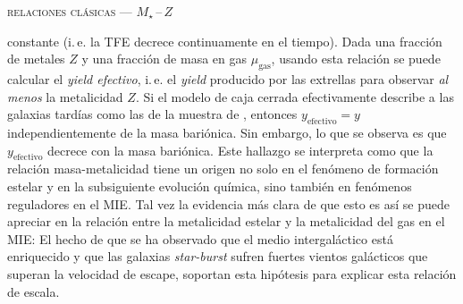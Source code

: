 \documentclass[xcolor=dvipsnames,4pt,hyperref={colorlinks,citecolor=black,linkcolor=black,urlcolor=black}]{beamer}
\begin{document}
\begin{frame}{\textsc{relaciones clásicas --- $M_\star\,$--$\,Z$}}
\begin{description}
constante (i.\,e. la TFE decrece \alert{continuamente} en el tiempo). Dada una fracción de metales
$Z$ y una fracción de masa en gas $\mu_\text{gas}$, usando esta relación se puede calcular el
\emph{yield efectivo}, i.\,e. el \emph{yield} producido por las extrellas para observar \emph{al
menos} la metalicidad $Z$. Si el modelo de caja cerrada efectivamente describe a las galaxias
tardías como las de la muestra de \citeauthor{Tremonti2004}, entonces $y_\text{efectivo}=y$
independientemente de la masa bariónica. Sin embargo, lo que se observa es que $y_\text{efectivo}$
decrece con la masa bariónica.
Este hallazgo se interpreta como que la relación masa-metalicidad tiene un origen no solo en el
fenómeno de formación estelar y en la subsiguiente evolución química, sino también en fenómenos
reguladores en el MIE. Tal vez la evidencia más clara de que esto es así se puede apreciar en la
relación entre la metalicidad estelar y la metalicidad del gas en el MIE:
El hecho de que se ha observado que el medio intergaláctico está enriquecido y que las galaxias
\emph{star-burst} sufren fuertes vientos galácticos que superan la velocidad de escape, soportan
esta hipótesis para explicar esta relación de escala.
%
\end{description}
\end{frame}
\end{document}

